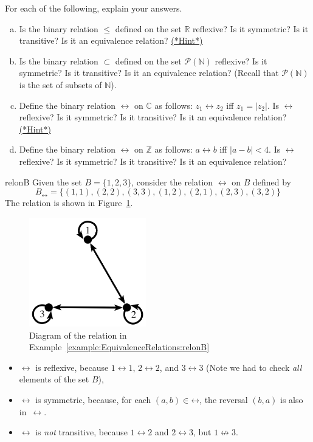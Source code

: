 \begin{exercise}{17}
For each of the following, explain your answers. 
\begin{enumerate}[(a)]
\item Is the binary relation $\leq$ defined on the set $\mathbb{R}$ reflexive? Is it symmetric? Is it transitive? Is it an equivalence relation?
\hyperref[sec:EquivalenceRelations:Hints]{(*Hint*)}
\item Is  the binary relation $\subset$ defined on the set $\mathcal{P}(\mathbb{N})$ reflexive? Is it symmetric? Is it transitive? Is it an equivalence relation? (Recall that $\mathcal{P}(\mathbb{N})$ is the set of subsets of $\mathbb{N}$).
\item Define the binary relation $\rel$ on $\mathbb{C}$ as follows: $ z_1 \rel z_2$ iff $z_1 = |z_2|$. Is $\rel$ reflexive? Is it symmetric? Is it transitive? Is it an equivalence relation? \hyperref[sec:EquivalenceRelations:Hints]{(*Hint*)} 
\item Define the binary relation $\rel$ on $\mathbb{Z}$ as follows: $ a \rel b$ iff $|a - b|< 4$. Is $\rel$ reflexive? Is it symmetric? Is it transitive? Is it an equivalence relation?
\end{enumerate}
\end{exercise}

\begin{example}{relonB}
Given the set $B = \{1,2,3\}$, consider the relation $\rel$ on $B$ defined by 
\[
B_\rel = \{(1,1), (2,2), (3,3), (1,2), (2,1), (2,3), (3,2) \}
\]
 The relation is shown in Figure~\ref{fig:relonB}.
\begin{figure}[htpb]
\begin{center}
 \includegraphics[width=2in]{images/relonB.png}
\caption{Diagram of the relation in Example~\ref{example:EquivalenceRelations:relonB}\label{fig:relonB}}
\end{center}
\end{figure}

\begin{itemize}
\item $\rel$ is reflexive, because $1 \rel 1$, $2 \rel 2$, and $3 \rel 3$  (Note we had to check \emph{all} elements of the set $B$),
\item $\rel$ is symmetric, because, for each $(a,b) \in \mathord{\rel}$, the reversal $(b,a)$ is also in~$\rel$.
\item $\rel$ is \emph{not} transitive, because $1 \rel 2$ and $2 \rel 3$, but $1 \not\rel 3$.
\end{itemize}
\end{example}

